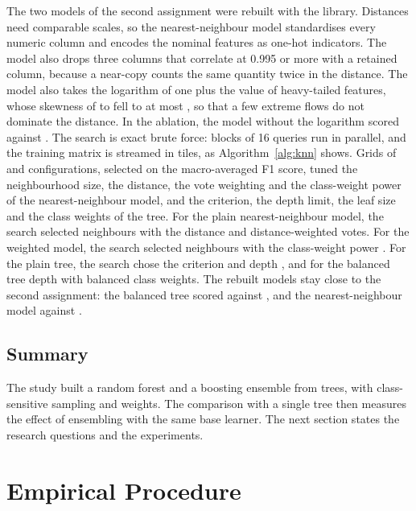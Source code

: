 \documentclass[10pt,conference]{IEEEtran}
\begin{document}
The two models of the second assignment were rebuilt with the library. Distances need comparable scales, so the nearest-neighbour model standardises every numeric column and encodes the nominal features as one-hot indicators. The model also drops three columns that correlate at 0.995 or more with a retained column, because a near-copy counts the same quantity twice in the distance. The model also takes the logarithm of one plus the value of \nLogged{} heavy-tailed features, whose skewness of \skewMin{} to \skewMax{} fell to at most \skewAfter{}, so that a few extreme flows do not dominate the distance. In the ablation, the model without the logarithm scored \AbKnnNoLogMacroF{} against \AbKnnFullMacroF{}. The search is exact brute force: blocks of 16 queries run in parallel, and the training matrix is streamed in tiles, as Algorithm~\ref{alg:knn} shows. Grids of \OKnnGrid{} and \OTreeGrid{} configurations, selected on the macro-averaged F1 score, tuned the neighbourhood size, the distance, the vote weighting and the class-weight power of the nearest-neighbour model, and the criterion, the depth limit, the leaf size and the class weights of the tree. For the plain nearest-neighbour model, the search selected \BlKnnK{} neighbours with the \BlKnnMetric{} distance and distance-weighted votes. For the weighted model, the search selected \BlKnnCwK{} neighbours with the class-weight power \BlKnnCwPower{}. For the plain tree, the search chose the \BlTreeCriterion{} criterion and depth \BlTreeDepth{}, and for the balanced tree depth \BlTreeBalancedDepth{} with balanced class weights. The rebuilt models stay close to the second assignment: the balanced tree scored \BlTreeBalancedMacroFMean{} against \OATwoTreeMacroF{}, and the nearest-neighbour model \BlKnnMacroFMean{} against \OATwoKnnMacroF{}.

\subsection{Summary}
\label{sec:meth-summary}

The study built a random forest and a boosting ensemble from trees, with class-sensitive sampling and weights. The comparison with a single tree then measures the effect of ensembling with the same base learner. The next section states the research questions and the experiments.

\section{Empirical Procedure}
\label{sec:procedure}
\end{document}
